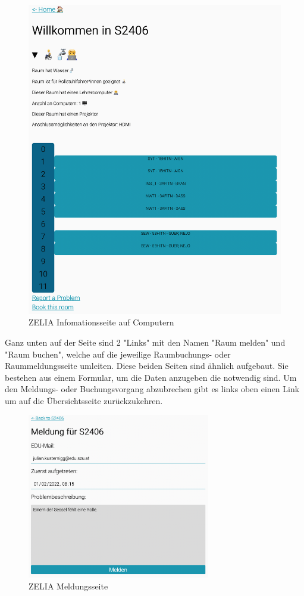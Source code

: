 \begin{figure}[H]
    \centering
    \includegraphics[width=120mm]{media/WebComponents/Rauminformationsseite_light.png}
    \caption{ZELIA Infomationsseite auf Computern}
    \label{fig:zeliainfopage}
\end{figure}

Ganz unten auf der Seite sind 2 "Links" mit den Namen "Raum melden" und "Raum buchen", welche auf die jeweilige Raumbuchungs- oder Raummeldungsseite umleiten. Diese beiden Seiten sind ähnlich aufgebaut. Sie bestehen aus einem Formular, um die Daten anzugeben die notwendig sind. Um den Meldungs- oder Buchungsvorgang abzubrechen gibt es links oben einen Link um auf die Übersichtsseite zurückzukehren.

\begin{figure}[H]
    \centering
    \includegraphics[width=80mm]{media/WebComponents/Meldungsseite_light.png}
    \caption{ZELIA Meldungsseite}
    
\end{figure}

